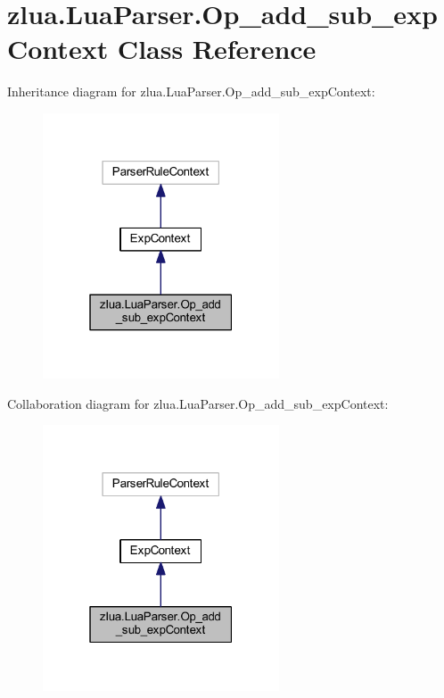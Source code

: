 \hypertarget{classzlua_1_1_lua_parser_1_1_op__add__sub__exp_context}{}\section{zlua.\+Lua\+Parser.\+Op\+\_\+add\+\_\+sub\+\_\+exp\+Context Class Reference}
\label{classzlua_1_1_lua_parser_1_1_op__add__sub__exp_context}


Inheritance diagram for zlua.\+Lua\+Parser.\+Op\+\_\+add\+\_\+sub\+\_\+exp\+Context\+:
\nopagebreak
\begin{figure}[H]
\begin{center}
\leavevmode
\includegraphics[width=199pt]{classzlua_1_1_lua_parser_1_1_op__add__sub__exp_context__inherit__graph}
\end{center}
\end{figure}


Collaboration diagram for zlua.\+Lua\+Parser.\+Op\+\_\+add\+\_\+sub\+\_\+exp\+Context\+:
\nopagebreak
\begin{figure}[H]
\begin{center}
\leavevmode
\includegraphics[width=199pt]{classzlua_1_1_lua_parser_1_1_op__add__sub__exp_context__coll__graph}
\end{center}
\end{figure}
